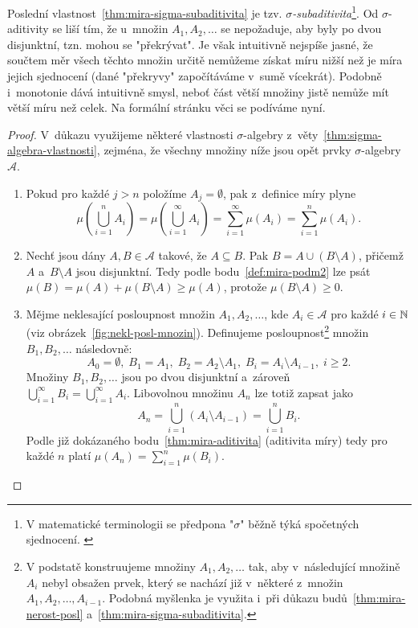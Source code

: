 Poslední vlastnost~\ref{thm:mira-sigma-subaditivita} je tzv. \emph{$\sigma$-subaditivita}\footnote{V matematické terminologii se předpona "$\sigma$" běžně týká spočetných sjednocení. \citep[str. 2]{Lukes2013}}. Od $\sigma$-aditivity se liší tím, že u~množin $A_1,A_2,\dots$ se nepožaduje, aby byly po dvou disjunktní, tzn. mohou se "překrývat". Je však intuitivně nejspíše jasné, že součtem měr všech těchto množin určitě nemůžeme získat míru nižší než je míra jejich sjednocení (dané "překryvy" započítáváme v~sumě vícekrát). Podobně i~monotonie dává intuitivně smysl, neboť část větší množiny jistě nemůže mít větší míru než celek. Na formální stránku věci se podíváme nyní.
\begin{proof}
    V~důkazu využijeme některé vlastnosti $\sigma$-algebry z~věty~\ref{thm:sigma-algebra-vlastnosti}, zejména, že všechny množiny níže jsou opět prvky $\sigma$-algebry~$\mathcal{A}$.
    \begin{enumerate}[label=\textit{(\roman*)}]
        \item Pokud pro každé $j>n$ položíme $A_j=\emptyset$, pak z~definice míry plyne
        \[\mu\left(\bigcup_{i=1}^n A_i\right)=\mu\left(\bigcup_{i=1}^\infty A_i\right)=\sum_{i=1}^{\infty}\mu(A_i)=\sum_{i=1}^{n}\mu(A_i).\]
        \item Nechť jsou dány $A,B\in\mathcal{A}$ takové, že $A\subseteq B$. Pak $B=A\cup(B\setminus A)$, přičemž $A$ a~$B\setminus A$ jsou disjunktní. Tedy podle bodu~\ref{def:mira-podm2} lze psát $\mu(B)=\mu(A)+\mu(B\setminus A)\geqslant\mu(A)$, protože $\mu(B\setminus A)\geqslant 0$.
        \item Mějme neklesající posloupnost množin $A_1,A_2,\ldots$, kde $A_i\in\mathcal{A}$ pro každé $i\in\mathbb{N}$ (viz obrázek~\ref{fig:nekl-posl-mnozin}).
        Definujeme posloupnost\footnote{V podstatě konstruujeme množiny $A_1,A_2,\ldots$ tak, aby v~následující množině $A_i$ nebyl obsažen prvek, který se nachází již v~některé z~množin $A_1,A_2,\ldots,A_{i-1}$. Podobná myšlenka je využita i~při důkazu budů~\ref{thm:mira-nerost-posl} a~\ref{thm:mira-sigma-subaditivita}.} množin $B_1,B_2,\ldots$ následovně:
        \[A_0=\emptyset,\;B_1=A_1,\;B_2=A_2\setminus A_1,\;B_i=A_i\setminus A_{i-1},\;i\geqslant 2.\]
        Množiny $B_1,B_2,\dots$ jsou po dvou disjunktní a~zároveň\\$\bigcup_{i=1}^\infty B_i=\bigcup_{i=1}^\infty A_i$. Libovolnou množinu $A_n$ lze totiž zapsat jako
        \[A_n=\bigcup_{i=1}^n (A_i\setminus A_{i-1})=\bigcup_{i=1}^n B_i.\] 
        Podle již dokázaného bodu~\ref{thm:mira-aditivita} (aditivita míry) tedy pro každé $n$ platí $\mu(A_n)=\sum_{i=1}^{n}\mu(B_i)$.

\end{enumerate}
\end{proof}
